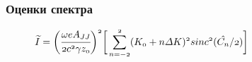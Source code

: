 \documentclass[14pt, hyperref = {colorlinks}]{beamer}
\begin{document}
\small
\begin{frame}
\frametitle{Оценки спектра}\label{t1}
\vspace{-5pt}
\begin{figure}[h]
\begin{minipage}[h]{0.49\linewidth}
	\vspace{-10pt}
\end{minipage}	

\end{figure}
\vspace{-15pt}
\begin{figure}[h]
$\mathnormal{{\widetilde{I}} =
	\bigg(\cfrac{\omega eA_{JJ}}{2c^2 \gamma z_0}\bigg)^2\bigg[
	\displaystyle\sum\limits_{n =-2}^{2}(K_0 + n\Delta K)^2sinc^2(\hat{C_n}/2)}\bigg]$\\

\end{figure}
\end{frame}
\end{document}
